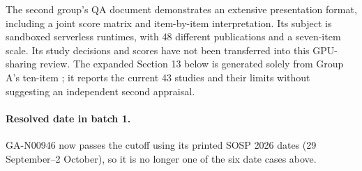 The second group's QA document demonstrates an extensive presentation format, including a joint score matrix and item-by-item interpretation. Its subject is sandboxed serverless runtimes, with 48 different publications and a seven-item scale. Its study decisions and scores have not been transferred into this GPU-sharing review. The expanded Section 13 below is generated solely from Group A's ten-item ; it reports the current 43 studies and their limits without suggesting an independent second appraisal.

\paragraph{Resolved date in batch 1.} GA-N00946 now passes the cutoff using its printed SOSP 2026 dates (29 September--2 October), so it is no longer one of the six date cases above.

